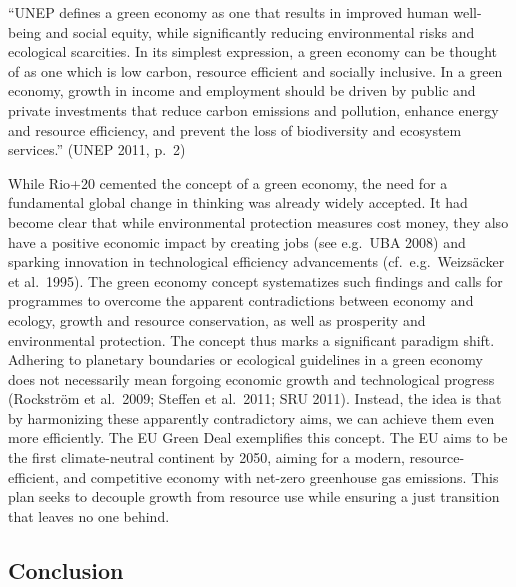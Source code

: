 \documentclass[
  a4paper,
  openany]{book}
\begin{document}
\begin{tcolorbox}[enhanced jigsaw, left=2mm, arc=.35mm, titlerule=0mm, opacityback=0, leftrule=.75mm, title={Note}, breakable, bottomtitle=1mm, rightrule=.15mm, coltitle=black, toptitle=1mm, bottomrule=.15mm, colback=white, opacitybacktitle=0.6, colbacktitle=quarto-callout-note-color!10!white, toprule=.15mm, colframe=quarto-callout-note-color-frame]

``UNEP defines a green economy as one that results in improved human
well-being and social equity, while significantly reducing environmental
risks and ecological scarcities. In its simplest expression, a green
economy can be thought of as one which is low carbon, resource efficient
and socially inclusive. In a green economy, growth in income and
employment should be driven by public and private investments that
reduce carbon emissions and pollution, enhance energy and resource
efficiency, and prevent the loss of biodiversity and ecosystem
services.'' (UNEP 2011, p.~2)

\end{tcolorbox}

While Rio+20 cemented the concept of a green economy, the need for a
fundamental global change in thinking was already widely accepted. It
had become clear that while environmental protection measures cost
money, they also have a positive economic impact by creating jobs (see
e.g.~UBA 2008) and sparking innovation in technological efficiency
advancements (cf.~e.g.~Weizsäcker et al.~1995). The green economy
concept systematizes such findings and calls for programmes to overcome
the apparent contradictions between economy and ecology, growth and
resource conservation, as well as prosperity and environmental
protection. The concept thus marks a significant paradigm shift.
Adhering to planetary boundaries or ecological guidelines in a green
economy does not necessarily mean forgoing economic growth and
technological progress (Rockström et al.~2009; Steffen et al.~2011; SRU
2011). Instead, the idea is that by harmonizing these apparently
contradictory aims, we can achieve them even more efficiently. The EU
Green Deal exemplifies this concept. The EU aims to be the first
climate-neutral continent by 2050, aiming for a modern,
resource-efficient, and competitive economy with net-zero greenhouse gas
emissions. This plan seeks to decouple growth from resource use while
ensuring a just transition that leaves no one behind.

\subsection{Conclusion}\label{conclusion-3}
\end{document}
